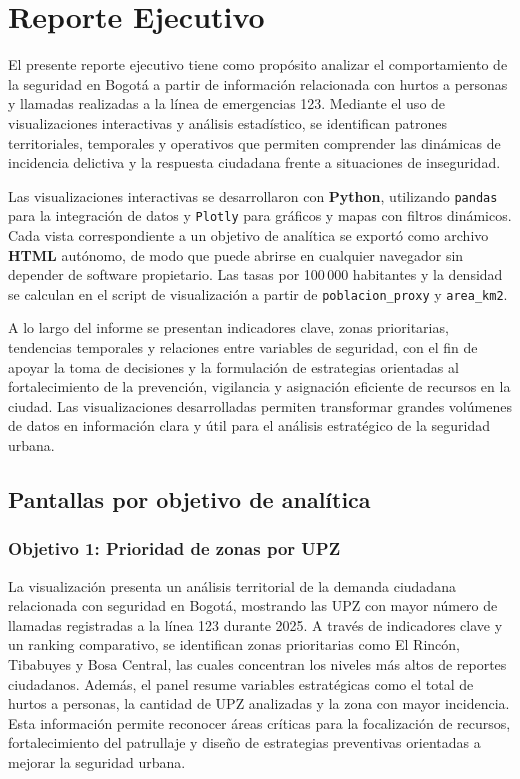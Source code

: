 \documentclass[12pt,letterpaper]{article}
\begin{document}
\section{Reporte Ejecutivo}

El presente reporte ejecutivo tiene como propósito analizar el comportamiento de la seguridad en Bogotá a partir de información relacionada con hurtos a personas y llamadas realizadas a la línea de emergencias 123. Mediante el uso de visualizaciones interactivas y análisis estadístico, se identifican patrones territoriales, temporales y operativos que permiten comprender las dinámicas de incidencia delictiva y la respuesta ciudadana frente a situaciones de inseguridad.

Las visualizaciones interactivas se desarrollaron con \textbf{Python}, utilizando \texttt{pandas} para la integración de datos y \texttt{Plotly} para gráficos y mapas con filtros dinámicos. Cada vista correspondiente a un objetivo de analítica se exportó como archivo \textbf{HTML} autónomo, de modo que puede abrirse en cualquier navegador sin depender de software propietario. Las tasas por 100\,000 habitantes y la densidad se calculan en el script de visualización a partir de \texttt{poblacion\_proxy} y \texttt{area\_km2}.

A lo largo del informe se presentan indicadores clave, zonas prioritarias, tendencias temporales y relaciones entre variables de seguridad, con el fin de apoyar la toma de decisiones y la formulación de estrategias orientadas al fortalecimiento de la prevención, vigilancia y asignación eficiente de recursos en la ciudad. Las visualizaciones desarrolladas permiten transformar grandes volúmenes de datos en información clara y útil para el análisis estratégico de la seguridad urbana.

\subsection{Pantallas por objetivo de analítica}

\subsubsection{Objetivo 1: Prioridad de zonas por UPZ}

La visualización presenta un análisis territorial de la demanda ciudadana relacionada con seguridad en Bogotá, mostrando las UPZ con mayor número de llamadas registradas a la línea 123 durante 2025. A través de indicadores clave y un ranking comparativo, se identifican zonas prioritarias como El Rincón, Tibabuyes y Bosa Central, las cuales concentran los niveles más altos de reportes ciudadanos. Además, el panel resume variables estratégicas como el total de hurtos a personas, la cantidad de UPZ analizadas y la zona con mayor incidencia. Esta información permite reconocer áreas críticas para la focalización de recursos, fortalecimiento del patrullaje y diseño de estrategias preventivas orientadas a mejorar la seguridad urbana.
\end{document}
